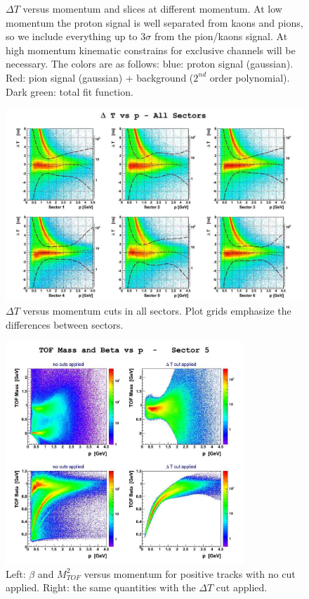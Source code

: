 \begin{figure}[ht]
		\caption{$\Delta T$ versus momentum and slices at different momentum.
					At low momentum the proton signal is well separated
					from kaons and pions, so we include everything up to
					$3\sigma$ from the pion/kaons signal. At high momentum 
					kinematic constrains for exclusive channels will be necessary.
					The colors are as follows: blue: proton signal (gaussian).
					Red: pion signal (gaussian) + background ($2^{nd}$ order 
					polynomial). Dark green: total fit function.}
 		\label{fig:dt_vs_mom}
\end{figure}



\begin{landscape}
\begin{figure}[h]
	\centering
		\includegraphics[width=1.45\textheight]{img/dt_vs_mom_all_sectors.jpg}
		\caption{$\Delta T$ versus momentum cuts in all sectors. Plot grids
					emphasize the differences between sectors.}
		\label{fig:dt_vs_mom_all_sectors}
\end{figure}
\end{landscape}




\begin{figure}[h]
	\centering
		\includegraphics[width=0.80\textwidth]{img/mass_beta_vs_p_sect5.jpg}
		\caption{Left: $\beta$ and $M_{TOF}^2$ versus momentum for positive
					tracks with no cut applied. Right: the same quantities with the
					$\Delta T$ cut applied.}
		\label{fig:mass_beta_vs_p_sect5}
\end{figure}


